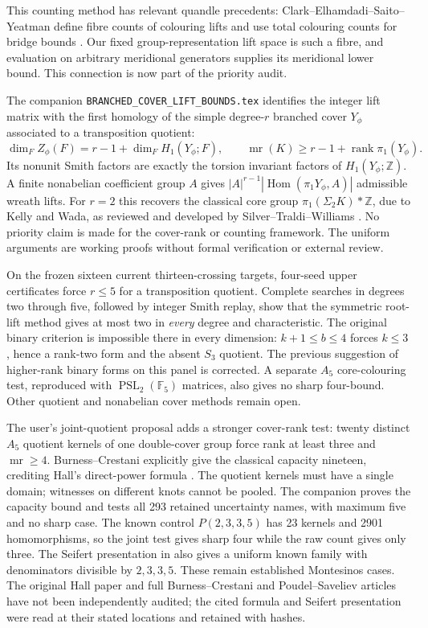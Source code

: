 \documentclass[11pt]{article}
\newcommand{\mr}{\operatorname{mr}}
\newcommand{\F}{\mathbb F}
\begin{document}
This counting method has relevant quandle precedents:
Clark--Elhamdadi--Saito--Yeatman define fibre counts of colouring lifts
and use total colouring counts for bridge bounds \cite{cesy}. Our fixed
group-representation lift space is such a fibre, and evaluation on
arbitrary meridional generators supplies its meridional lower bound.
This connection is now part of the priority audit.

The companion \texttt{BRANCHED\_COVER\_LIFT\_BOUNDS.tex} identifies the
integer lift matrix with the first homology of the simple degree-$r$
branched cover $Y_\phi$ associated to a transposition quotient:
\[
 \dim_F Z_\phi(F)=r-1+\dim_F H_1(Y_\phi;F),\qquad
 \mr(K)\ge r-1+\operatorname{rank}\pi_1(Y_\phi).
\]
Its nonunit Smith factors are exactly the torsion invariant factors of
$H_1(Y_\phi;\mathbb Z)$. A finite nonabelian coefficient group $A$
gives $|A|^{r-1}|\operatorname{Hom}(\pi_1Y_\phi,A)|$ admissible wreath
lifts. For $r=2$ this recovers the classical core group
$\pi_1(\Sigma_2K)*\mathbb Z$, due to Kelly and Wada, as reviewed and
developed by Silver--Traldi--Williams \cite{core}. No priority claim is
made for the cover-rank or counting framework. The uniform arguments
are working proofs without formal verification or external review.

On the frozen sixteen current thirteen-crossing targets, four-seed
upper certificates force $r\le5$ for a transposition quotient.
Complete searches in degrees two through five, followed by integer
Smith replay, show that the symmetric root-lift method gives at most
two in \emph{every} degree and characteristic. The original binary
criterion is impossible there in every dimension: $k+1\le b\le4$
forces $k\le3$, hence a rank-two form and the absent $S_3$ quotient.
The previous suggestion of higher-rank binary forms on this panel
is corrected. A separate $A_5$ core-colouring test, reproduced with
$\operatorname{PSL}_2(\F_5)$ matrices, also gives no sharp four-bound.
Other quotient and nonabelian cover methods remain open.

The user's joint-quotient proposal adds a stronger cover-rank test:
twenty distinct $A_5$ quotient kernels of one double-cover group
force rank at least three and $\mr\ge4$. Burness--Crestani explicitly
give the classical capacity nineteen, crediting Hall's direct-power
formula \cite[p.~2]{bc}. The quotient kernels must have a single
domain; witnesses on different knots cannot be pooled. The companion
 proves the capacity bound
and tests all 293 retained uncertainty names, with maximum five and
no sharp case. The known control $P(2,3,3,5)$ has 23 kernels and
2901 homomorphisms, so the joint test gives sharp four while the raw
count gives only three. The Seifert presentation in
\cite[Section 7.3]{ps} also gives a uniform known family with
denominators divisible by $2,3,3,5$. These remain established
Montesinos cases. The original Hall paper and full Burness--Crestani
and Poudel--Saveliev articles have not been independently audited;
the cited formula and Seifert presentation were read at their stated
locations and retained with hashes.
\end{document}
